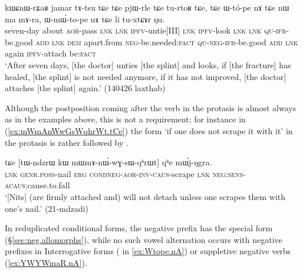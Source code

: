 \begin{exe}
\ex \label{ex:Wtope.nA}
 \gll   kɯɕnɯ-rʑaʁ jamar tɤ-tsu tɕe tɕe pjɯ-rle tɕe tu-rtoʁ tɕe, tɕe ɯ-tó-pe nɤ tɕe nɯ ma mɤ-ra,
ɯ-mɯ́-to-pe nɤ tɕe li tu-xtɕɤr ŋu. \\
seven-day about \textsc{aor}-pass \textsc{lnk} \textsc{lnk} \textsc{ipfv}-untie[III] \textsc{lnk} \textsc{ipfv}-look \textsc{lnk} \textsc{lnk} \textsc{qu}-\textsc{ifr}-be.good \textsc{add} \textsc{lnk} \textsc{dem} apart.from \textsc{neg}-be.needed:\textsc{fact} \textsc{qu}-\textsc{neg}-\textsc{ifr}-be.good \textsc{add} \textsc{lnk} again \textsc{ipfv}-attach be:\textsc{fact} \\
\glt `After seven days, [the doctor] unties [the splint] and looks, if [the fracture] has healed, [the splint] is not needed anymore, if it has not improved, [the doctor] attaches [the splint] again.' (140426 laxthab)
\end{exe}
 
Although the postposition coming after the verb in the protasis is almost always  as in the examples above, this is not a requirement; for instance in (\ref{ex:mWmAnWwGsWqhrWt.tCe}) the form  `if one does not scrape it with it' in the protasis is rather followed by .

 \begin{exe}
\ex \label{ex:mWmAnWwGsWqhrWt.tCe}
 \gll tɕe [tɯ-ndzrɯ kɯ mɯ\redp{}mɤ-nɯ́-wɣ-sɯ-qʰrɯt] qʰe mɯ́j-ŋgra. \\
 \textsc{lnk} \textsc{genr}.\textsc{poss}-nail \textsc{erg} \textsc{cond}\redp{}\textsc{neg}-\textsc{aor}-\textsc{inv}-\textsc{caus}-scrape \textsc{lnk} \textsc{neg}:\textsc{sens}-\textsc{acaus}:cause.to.fall \\
 \glt `[Nits] (are firmly attached and) will not detach unless one scrapes them with one's nail.' (21-mdzadi)
 \end{exe}

In reduplicated conditional forms, the negative prefix  has the special form  (§\ref{sec:neg.allomorphs}), while no such vowel alternation occurs with negative prefixes in Interrogative forms ( in \ref{ex:Wtope.nA}) or suppletive negative verbs (\ref{ex:YWYWmaR.nA}).

